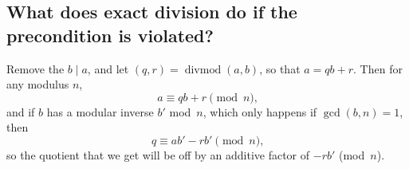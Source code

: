 \documentclass{computer-arithmetic}
\begin{document}
\subsection{What does exact division do if the precondition is violated?}

Remove the \(b \mid a\), and let
\((q, r) = \operatorname{divmod}(a, b)\), so that \(a = qb + r\). Then
for any modulus \(n\),
\[
  a ≡ qb + r \pmod n\text{,}
\]
and if \(b\) has a modular inverse \(b'\) mod~\(n\), which only
happens if \(\gcd(b, n) = 1\), then
\[
  q ≡ ab' - rb' \pmod n\text{,}
\]
so the quotient that we get will be off by an additive factor of
\(-rb'\) (mod~\(n\)).
\end{document}

